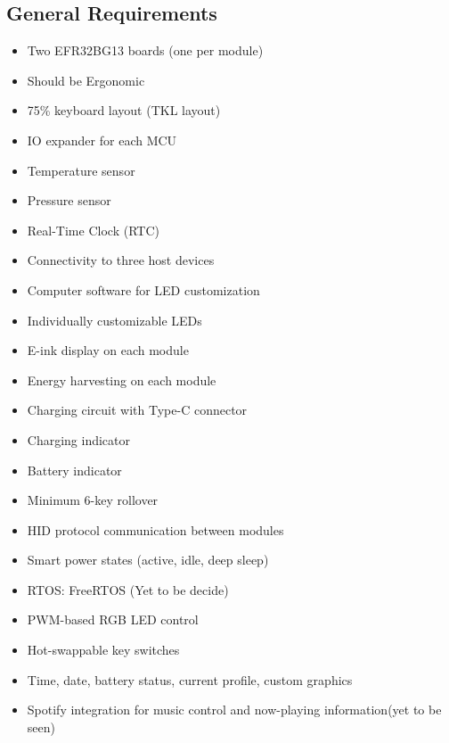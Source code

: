 \documentclass[a4paper,11pt]{article}%
\begin{document}
\subsection{General Requirements}
\begin{itemize}
\item Two EFR32BG13 boards (one per module)
\item Should be Ergonomic
\item 75\% keyboard layout (TKL layout)
\item IO expander for each MCU
\item Temperature sensor
\item Pressure sensor
\item Real-Time Clock (RTC)
\item Connectivity to three host devices
\item Computer software for LED customization
\item Individually customizable LEDs
\item E-ink display on each module
\item Energy harvesting on each module
\item Charging circuit with Type-C connector
\item Charging indicator
\item Battery indicator
\item Minimum 6-key rollover
\item HID protocol communication between modules
\item Smart power states (active, idle, deep sleep)
\item RTOS: FreeRTOS (Yet to be decide)
\item PWM-based RGB LED control
\item Hot-swappable key switches
\item Time, date, battery status, current profile, custom graphics
\item Spotify integration for music control and now-playing information(yet to be seen)
\end{itemize}
\end{document}
